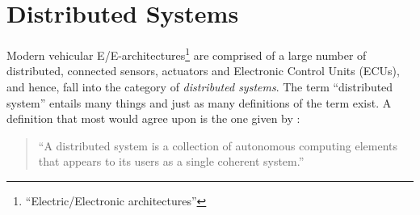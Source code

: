 \section{Distributed Systems}
Modern vehicular E/E-architectures\footnote{``Electric/Electronic architectures''} are comprised of a large number of distributed, connected sensors, actuators and Electronic Control Units (ECUs), and hence, fall into the category of \emph{distributed systems}. The term ``distributed system'' entails many things and just as many definitions of the term exist. A definition that most would agree upon is the one given by \citeauthor*{tanenbaum2017distributed} \cite{tanenbaum2017distributed}: 
\begin{quote}
``A distributed system is a collection of autonomous computing elements that appears to its users as a single coherent system.''
\end{quote}

